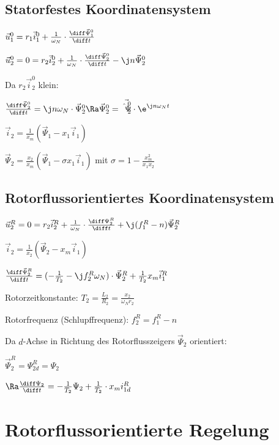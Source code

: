 \documentclass[german]{latex4ei_fs}
\begin{document}
\begin{sectionbox}
\subsection{Statorfestes Koordinatensystem}

$\vec u_1^0 = r_1 \vec i_1^0 + \frac{1}{\omega_N} \cdot \frac{\diff \vec \Psi_1^0}{\diff t}$

$\vec u_2^0 = 0 = r_2 \vec i_2^0 + \frac{1}{\omega_N} \cdot \frac{\diff \vec \Psi_2^0}{\diff t} - \j n \vec \Psi_2^0$

Da $r_2 \vec i_2^0$ klein:

$\frac{\diff \vec \Psi_2^0}{\diff t} = \j n \omega_N \cdot \vec \Psi_2^0 \Ra \vec \Psi_2^0 = \vec{\hat \Psi_2^0} \cdot \e^{\j n \omega_N t}$

$\vec i_2 = \frac{1}{x_m} (\vec \Psi_1 - x_1 \vec i_1)$

$\vec \Psi_2 = \frac{x_2}{x_m} (\vec \Psi_1 - \sigma x_1 \vec i_1)$ mit $\sigma = 1 - \frac{x_m^2}{x_1 x_2}$

\end{sectionbox}
\begin{sectionbox}
\subsection{Rotorflussorientiertes Koordinatensystem}

$\vec u_2^R = 0 = r_2 \vec i_2^R + \frac{1}{\omega_N} \cdot \frac{\diff \Psi_2^R}{\diff t} + \j (f_1^R - n) \vec \Psi_2^R$

$\vec i_2 = \frac{1}{x_2} (\vec \Psi_2 - x_m \vec i_1)$

$\frac{\diff \vec \Psi_2^R}{\diff t} = (- \frac{1}{T_2} - \j f_2^R \omega_N) \cdot \vec \Psi_2^R + \frac{1}{T_2} x_m \vec i_1^R$ 

Rotorzeitkonstante: $T_2 = \frac{L_2}{R_2} = \frac{x_2}{\omega_N r_2}$

Rotorfrequenz (Schlupffrequenz): $f_2^R = f_1^R - n$

Da $d$-Achse in Richtung des Rotorflusszeigers $\vec \Psi_2$ orientiert:

$\vec \Psi_2^R = \Psi_{2d}^R = \Psi_2$

$\Ra \frac{\diff \Psi_2}{\diff t} = - \frac{1}{T_2} \Psi_2 + \frac{1}{T_2} \cdot x_m i_{1d}^R$
\end{sectionbox}


\section{Rotorflussorientierte Regelung} 
\end{document}
